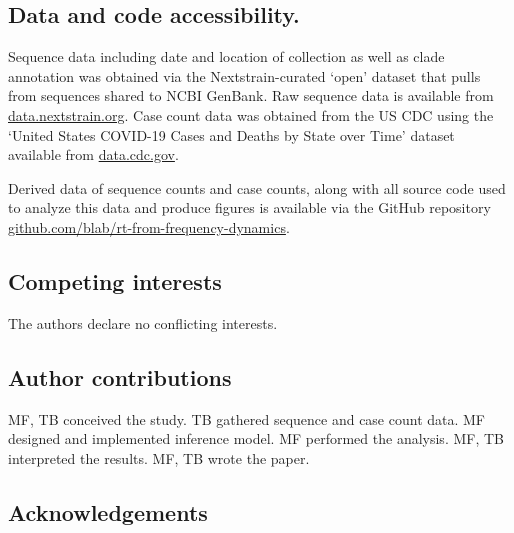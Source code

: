 \documentclass[11pt,oneside,letterpaper]{article}
\begin{document}

\subsection*{Data and code accessibility.}

Sequence data including date and location of collection as well as clade annotation was obtained via the Nextstrain-curated `open' dataset \cite{Hadfield2018} that pulls from sequences shared to NCBI GenBank.
Raw sequence data is available from \href{https://docs.nextstrain.org/projects/ncov/en/latest/reference/remote_inputs.html}{data.nextstrain.org}.
Case count data was obtained from the US CDC using the `United States COVID-19 Cases and Deaths by State over Time' dataset available from \href{https://data.cdc.gov/Case-Surveillance/United-States-COVID-19-Cases-and-Deaths-by-State-o/9mfq-cb36}{data.cdc.gov}.

Derived data of sequence counts and case counts, along with all source code used to analyze this data and produce figures is available via the GitHub repository \href{https://github.com/blab/rt-from-frequency-dynamics/}{github.com/blab/rt-from-frequency-dynamics}.

\subsection*{Competing interests}%

The authors declare no conflicting interests.

\subsection*{Author contributions}

MF, TB conceived the study.
TB gathered sequence and case count data.
MF designed and implemented inference model.
MF performed the analysis.
MF, TB interpreted the results.
MF, TB wrote the paper.

\subsection*{Acknowledgements}%
\end{document}
